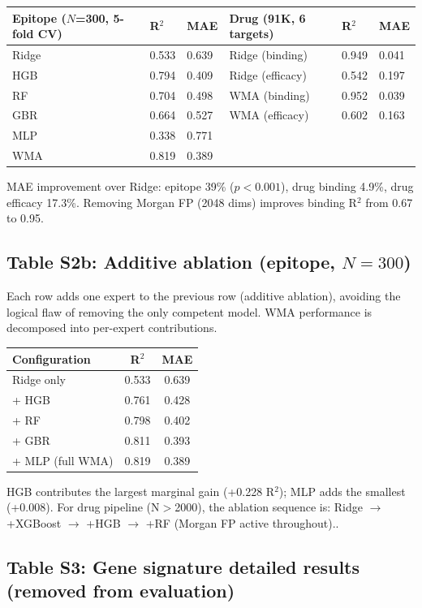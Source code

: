 \begin{tabular}{llllll}
\toprule
\textbf{Epitope ($N$=300, 5-fold CV)} & \textbf{R$^2$} & \textbf{MAE} & \textbf{Drug (91K, 6 targets)} & \textbf{R$^2$} & \textbf{MAE} \\
\midrule
Ridge & 0.533 & 0.639 & Ridge (binding) & 0.949 & 0.041 \\
HGB & 0.794 & 0.409 & Ridge (efficacy) & 0.542 & 0.197 \\
RF & 0.704 & 0.498 & WMA (binding) & 0.952 & 0.039 \\
GBR & 0.664 & 0.527 & WMA (efficacy) & 0.602 & 0.163 \\
MLP & 0.338 & 0.771 & & & \\
WMA & 0.819 & 0.389 & & & \\
\bottomrule
\end{tabular}

MAE improvement over Ridge: epitope 39\% ($p{<}0.001$), drug binding 4.9\%, drug efficacy 17.3\%. Removing Morgan FP (2048 dims) improves binding R$^2$ from 0.67 to 0.95.

\subsection*{Table S2b: Additive ablation (epitope, $N{=}300$)}

\small Each row adds one expert to the previous row (additive ablation), avoiding the logical flaw of removing the only competent model. WMA performance is decomposed into per-expert contributions.

\begin{tabular}{lcc}
\toprule
\textbf{Configuration} & \textbf{R$^2$} & \textbf{MAE} \\
\midrule
Ridge only & 0.533 & 0.639 \\
+ HGB & 0.761 & 0.428 \\
+ RF & 0.798 & 0.402 \\
+ GBR & 0.811 & 0.393 \\
+ MLP (full WMA) & 0.819 & 0.389 \\
\bottomrule
\end{tabular}

HGB contributes the largest marginal gain (+0.228 R$^2$); MLP adds the smallest (+0.008). For drug pipeline (N$>$2000), the ablation sequence is: Ridge $\to$ +XGBoost $\to$ +HGB $\to$ +RF (Morgan FP active throughout)..

\subsection*{Table S3: Gene signature detailed results (removed from evaluation)}

